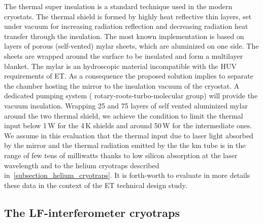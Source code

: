 The thermal super insulation is a standard technique used in the modern cryostats. The thermal shield is formed by highly heat reflective thin layers, set under vacuum for increasing radiation reflection and decreasing radiation heat transfer through the insulation. The most known implementation is based on layers of porous (self-vented) mylar sheets, which are aluminized on one side. The sheets are wrapped around the surface to be insulated and form a multilayer blanket. The mylar is an hydroscopic material incompatible with the HUV requirements of ET. As a consequence the proposed solution implies to separate the chamber hosting the mirror to the insulation vacuum of the cryostat. A dedicated pumping system ( rotary-roots-turbo-molecular group) will provide the vacuum insulation. Wrapping 25 and 75 layers of self vented aluminized mylar around the two thermal shield, we achieve the condition to limit the thermal input below 1\,W for the 4\,K shields and around 50\,W for the intermediate ones. We assume in this evaluation that the thermal input due to laser light absorbed by the mirror and the thermal radiation emitted by the the km tube is in the range of few tens of milliwatts thanks to low silicon absorption at the laser wavelength and to the helium cryotraps described in~\ref{subsection_helium_cryotraps}. It is forth-worth to evaluate in more details these data in the context of the ET technical design study. 

\subsection{The LF-interferometer cryotraps}

